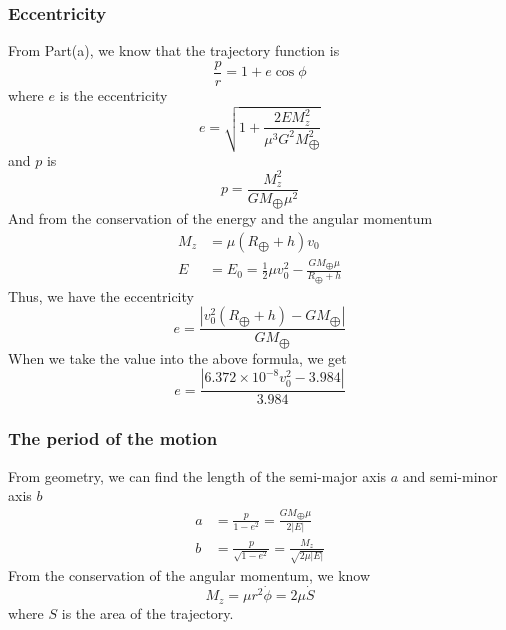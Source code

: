\documentclass[%
 reprint,
 amsmath,amssymb,
 aps,
]{revtex4-1}
\begin{document}
\subsubsection{Eccentricity}
From Part(a), we know that the trajectory function is 
\begin{equation*}
    \frac{p}{r}=1+e\cos{\phi}
\end{equation*}
where $e$ is the eccentricity
\begin{equation*}
    e=\sqrt{1+\frac{2EM_z^2}{\mu^3 G^2M^2_{\bigoplus}}}
\end{equation*}
and $p$ is 
\begin{equation*}
    p=\frac{M_z^2}{GM_{\bigoplus}\mu^2}
\end{equation*}
And from the conservation of the energy and the angular momentum
\begin{equation*}
\begin{aligned}
M_z&=\mu(R_{\bigoplus}+h)v_0
\\E&=E_0=\frac{1}{2}\mu v_0^2-\frac{GM_{\bigoplus}\mu}{R_{\bigoplus}+h}
\end{aligned}
\end{equation*}
Thus, we have the eccentricity 
\begin{equation*}
    e=\frac{|v_0^2(R_{\bigoplus}+h)-GM_{\bigoplus}|}{GM_{\bigoplus}}
\end{equation*}
When we take the value into the above formula, we get
\begin{equation*}
    e=\frac{|6.372\times10^{-8}v_0^2-3.984|}{3.984}
\end{equation*}
\subsubsection{The period of the motion}
From geometry, we can find the length of the semi-major axis $a$ and semi-minor axis $b$
\begin{equation*}
 \begin{aligned}
 a&=\frac{p}{1-e^2}=\frac{GM_{\bigoplus}\mu}{2|E|}
 \\b&=\frac{p}{\sqrt{1-e^2}}=\frac{M_z}{\sqrt{2\mu|E|}}
 \end{aligned}  
\end{equation*}
From the conservation of the angular momentum, we know
\begin{equation*}
M_z=\mu r^2\dot{\phi}=2\mu\dot{S}    
\end{equation*}
where $S$ is the area of the trajectory.
\end{document}
